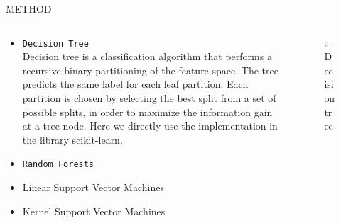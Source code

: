 \documentclass[final,hyperref={pdfpagelabels=false}]{beamer}
\begin{document}
\begin{frame}[t]
\begin{columns}[t]
\begin{column}{.465\textwidth}
\begin{block}{METHOD}
\begin{columns}
\begin{column}{.5\textwidth}
\begin{itemize}
\item \texttt{Decision Tree} \\
		Decision tree is a classification algorithm that performs a recursive binary partitioning of the feature space. The tree predicts the same label for each leaf partition. Each partition is chosen by selecting the best split from a set of possible splits, in order to maximize the information gain at a tree node. Here we directly use the implementation in the library scikit-learn.
\item \texttt{Random Forests}
	
\item Linear Support Vector Machines

\item Kernel Support Vector Machines
\end{itemize}

\end{column}

\begin{column}{.4\textwidth}

\begin{figure}
\includegraphics[width=1\linewidth]{decision_tree.png}
\caption{Decision tree}
\end{figure}

\end{column}

\end{columns}







\end{block}
\end{column}
\end{columns}
\end{frame}
\end{document}
